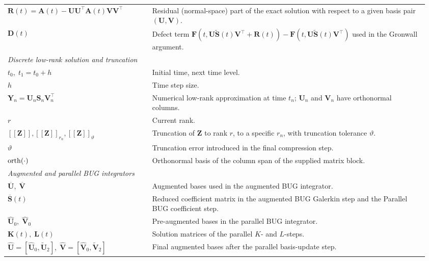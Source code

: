 \documentclass[preprint,runningheads]{svjour3}
\def\wh{\widehat}
\newcommand\bfA{{\mathbf A}}
\newcommand\bfD{{\mathbf D}}
\newcommand\bfF{{\mathbf F}}
\newcommand\bfK{{\mathbf K}}
\newcommand\bfL{{\mathbf L}}
\newcommand\bfR{{\mathbf R}}
\newcommand\bfS{{\mathbf S}}
\newcommand\bfU{{\mathbf U}}
\newcommand\bfV{{\mathbf V}}
\newcommand\bfY{{\mathbf Y}}
\newcommand\bfZ{{\mathbf Z}}
\begin{document}
\begin{longtable}{p{0.33\linewidth} p{0.63\linewidth}}
$\bfR(t) = \bfA(t)-\bfU\bfU^\top\bfA(t)\bfV\bfV^\top$
& Residual (normal-space) part of the exact solution with respect to a given basis pair $(\bfU,\bfV)$. \\

$\bfD(t)$
& Defect term $\bfF(t,\bfU\widetilde\bfS(t)\bfV^\top+\bfR(t))-\bfF(t,\bfU\widetilde\bfS(t)\bfV^\top)$ used in the Gronwall argument. \\

\hline
\multicolumn{2}{l}{\textit{Discrete low-rank solution and truncation}}\\
\hline
$t_0,\;t_1=t_0+h$
& Initial time, next time level. \\

$h$
& Time step size. \\

$\bfY_n=\bfU_n\bfS_n\bfV_n^\top$
& Numerical low-rank approximation at time $t_n$; $\bfU_n$ and $\bfV_n$ have orthonormal columns. \\

$r$
& Current rank. \\

$[\![\bfZ]\!], [\![\bfZ]\!]_{r_n}, [\![\bfZ]\!]_{\vartheta}$
& Truncation of $\bfZ$ to rank $r$, to a specific $r_n$, with truncation tolerance $\vartheta$. \\

$\vartheta$
& Truncation error introduced in the final compression step. \\

${\rm orth}(\cdot)$
& Orthonormal basis of the column span of the supplied matrix block. \\

\hline
\multicolumn{2}{l}{\textit{Augmented and parallel BUG integrators}}\\
\hline
$\overline{\bfU},\;\overline{\bfV}$
& Augmented bases used in the augmented BUG integrator. \\

$\overline{\bfS}(t)$
& Reduced coefficient matrix in the augmented BUG Galerkin step and the Parallel BUG coefficient step. \\

$\wh\bfU_0,\;\wh\bfV_0$
& Pre-augmented bases in the parallel BUG integrator. \\

$\bfK(t),\;\bfL(t)$
& Solution matrices of the parallel $K$- and $L$-steps. \\

$\wh\bfU=[\wh\bfU_0,\widetilde{\bfU}_2],\;
 \wh\bfV=[\wh\bfV_0,\widetilde{\bfV}_2]$
& Final augmented bases after the parallel basis-update step. \\


\end{longtable}
\end{document}
